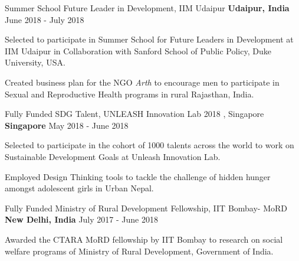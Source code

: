 \begin{cventries}
\cventry
{Summer School} %
{Future Leader in Development, IIM Udaipur} %
{\textbf{Udaipur, India}} %
{June 2018 - July 2018} %
{ %
\begin{cvitems}
\item {Selected to participate in Summer School for Future Leaders in Development at IIM Udaipur in Collaboration with Sanford School of Public Policy, Duke University, USA.}
\item {Created business plan for the NGO \textit{Arth} to encourage men to participate in Sexual and Reproductive Health programs in rural Rajasthan, India.}
\end{cvitems}
}



\cventry
{Fully Funded} %
{SDG Talent, UNLEASH Innovation Lab 2018 , Singapore} %
{\textbf{Singapore}} %
{May 2018 - June 2018} %
{ %
\begin{cvitems}
\item {Selected to participate in the cohort of 1000 talents across the world to work on Sustainable Development Goals at Unleash Innovation Lab.}
\item {Employed Design Thinking tools to tackle the challenge of hidden hunger amongst adolescent girls in Urban Nepal.}
\end{cvitems}
}


\cventry
{Fully Funded} %
{Ministry of Rural Development Fellowship, IIT Bombay- MoRD} %
{\textbf{New Delhi, India}} %
{July 2017 - June 2018} %
{ %
\begin{cvitems}
\item {Awarded the CTARA MoRD fellowship by IIT Bombay to research on social welfare programs of Ministry of Rural Development, Government of India.}
\end{cvitems}
}



\end{cventries}